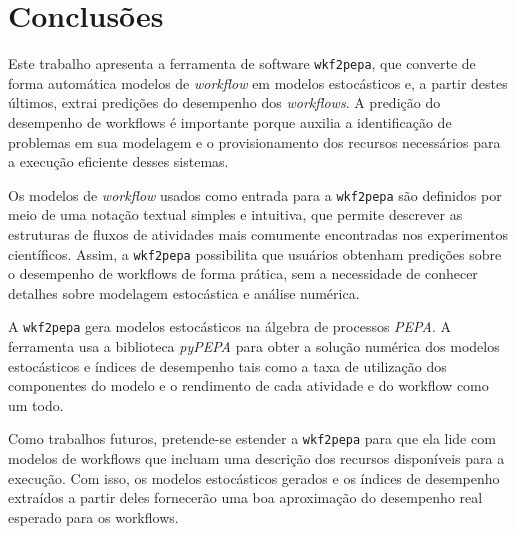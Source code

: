 \documentclass[a4paper,10pt]{article}
\begin{document}
    \newpage
    \section*{Conclusões}

    Este trabalho apresenta a ferramenta de software \texttt{wkf2pepa}, que converte de forma autom\'atica modelos de \emph{workflow} em modelos estocásticos e, a partir destes \'ultimos, extrai predições do desempenho dos \emph{workflows}. A predição do desempenho de workflows é importante porque auxilia a identificação de problemas em sua modelagem e o provisionamento dos recursos necessários para a execução eficiente desses sistemas.

    Os modelos de \emph{workflow} usados como entrada para a \texttt{wkf2pepa} são definidos por meio de uma notaç\~ao textual simples e intuitiva, que permite descrever as estruturas de fluxos de atividades mais comumente encontradas nos experimentos cient\'ificos. Assim, a \texttt{wkf2pepa} possibilita que usuários obtenham predições sobre o desempenho de workflows de forma prática, sem a necessidade de conhecer detalhes sobre modelagem estocástica e análise numérica.

    A \texttt{wkf2pepa} gera modelos estocásticos na álgebra de processos \emph{PEPA}. A ferramenta usa a biblioteca \emph{pyPEPA} para obter a solução numérica dos modelos estocásticos e índices de desempenho tais como a taxa de utilização dos componentes do modelo e o rendimento de cada atividade e do workflow como um todo.

    Como trabalhos futuros, pretende-se estender a \texttt{wkf2pepa} para que ela lide com modelos de workflows que incluam uma descrição dos recursos disponíveis para a execução. Com isso, os modelos estocásticos gerados e os índices de desempenho extraídos a partir deles fornecerão uma boa aproximação do desempenho real esperado para os workflows.


    
    
\end{document}
